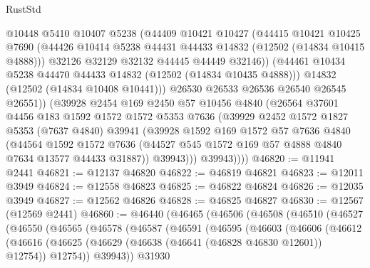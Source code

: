 \begin{lexlean}{RustStd}
\begin{coremodule}
                @10448
                @5410
                @10407
                @5238
                (@44409
                  @10421
                  @10427
                  (@44415
                    @10421
                    @10425
                    @7690
                    (@44426 @10414 @5238 @44431 @44433 @14832 (@12502 (@14834 @10415 @4888)))
                    @32126
                    @32129
                    @32132
                    @44445
                    @44449
                    @32146))
                (@44461 @10434 @5238 @44470 @44433 @14832 (@12502 (@14834 @10435 @4888)))
                @14832
                (@12502 (@14834 @10408 @10441)))
              @26530
              @26533
              @26536
              @26540
              @26545
              @26551))
          (@39928
            @2454
            @169
            @2450
            @57
            @10456
            @4840
            (@26564
              @37601
              @4456
              @183
              @1592
              @1572
              @1572
              @5353
              @7636
              (@39929
                @2452
                @1572
                @1827
                @5353
                (@7637 @4840)
                @39941
                (@39928
                  @1592
                  @169
                  @1572
                  @57
                  @7636
                  @4840
                  (@44564
                    @1592
                    @1572
                    @7636
                    (@44527 @545 @1572 @169 @57 @4888 @4840 @7634 @13577 @44433 @31887))
                  @39943)))
            @39943))))
@46820 := @11941 @2441
@46821 := @12137 @46820
@46822 := @46819 @46821
@46823 := @12011 @3949
@46824 := @12558 @46823
@46825 := @46822 @46824
@46826 := @12035 @3949
@46827 := @12562 @46826
@46828 := @46825 @46827
@46830 := @12567 (@12569 @2441)
@46860 := @46440
    (@46465
      (@46506
        (@46508
          (@46510
            (@46527
              (@46550
                (@46565
                  (@46578
                    (@46587
                      (@46591
                        (@46595
                          (@46603
                            (@46606
                              (@46612
                                (@46616
                                  (@46625
                                    (@46629 (@46638 (@46641 (@46828 @46830 @12601)) @12754))
                                    @12754))
                                @39943))
                            @31930

\end{coremodule}
\end{lexlean}
